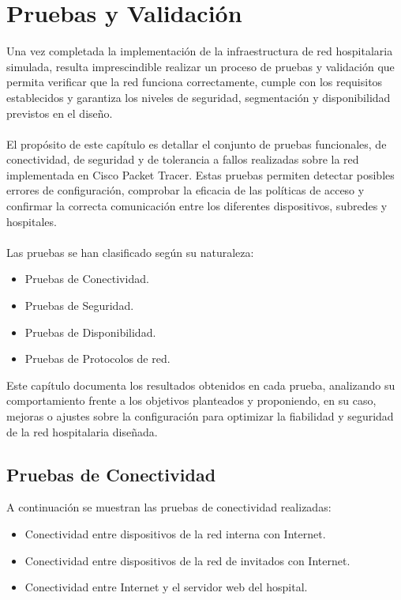 
\chapter{Pruebas y Validación}\label{pruebas}
Una vez completada la implementación de la infraestructura de red hospitalaria simulada, resulta imprescindible realizar un proceso de pruebas y validación que permita 
verificar que la red funciona correctamente, cumple con los requisitos establecidos y garantiza los niveles de seguridad, segmentación y disponibilidad previstos en el diseño.
\\ \\
El propósito de este capítulo es detallar el conjunto de pruebas funcionales, de conectividad, de seguridad y de tolerancia a fallos realizadas sobre la red implementada en 
Cisco Packet Tracer. Estas pruebas permiten detectar posibles errores de configuración, comprobar la eficacia de las políticas de acceso y confirmar la correcta comunicación 
entre los diferentes dispositivos, subredes y hospitales.
\\ \\
Las pruebas se han clasificado según su naturaleza:
\begin{itemize}
    \item Pruebas de Conectividad.
    \item Pruebas de Seguridad.
    \item Pruebas de Disponibilidad.
    \item Pruebas de Protocolos de red.
\end{itemize}

Este capítulo documenta los resultados obtenidos en cada prueba, analizando su comportamiento frente a los objetivos planteados y proponiendo, en su caso, mejoras o ajustes sobre 
la configuración para optimizar la fiabilidad y seguridad de la red hospitalaria diseñada.

\section{Pruebas de Conectividad}
A continuación se muestran las pruebas de conectividad realizadas:
\begin{itemize}
    \item Conectividad entre dispositivos de la red interna con Internet.
    \item Conectividad entre dispositivos de la red de invitados con Internet.
    \item Conectividad entre Internet y el servidor web del hospital.
\end{itemize}

